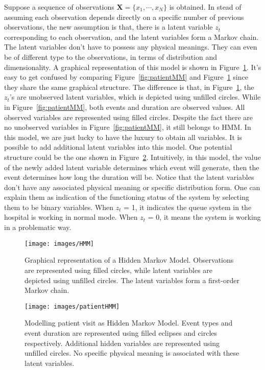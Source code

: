 Suppose a sequence of observations \(\mathbf{X} = \{x_1, \cdots, x_N\}\) is obtained. In stead of assuming each observation depends directly on a specific number of previous observations, the new assumption is that, there is a latent variable \(z_t\) corresponding to each observation, and the latent variables form a Markov chain. The latent variables don't have to possess any physical meanings. They can even be of different type to the observations, in terms of distribution and dimensionality. A graphical representation of this model is shown in Figure~\ref{fig:HMM}. It's easy to get confused by comparing Figure~\ref{fig:patientMM} and Figure~\ref{fig:HMM} since they share the same graphical structure. The difference is that, in Figure~\ref{fig:HMM}, the \(z_t\)'s are unobserved latent variables, which is depicted using unfilled circles. While in Figure~\ref{fig:patientMM}, both events and duration are observed values. All observed variables are represented using filled circles. Despite the fact there are no unobserved variables in Figure~\ref{fig:patientMM}, it still belongs to HMM. In this model, we are just lucky to have the luxury to obtain all variables. It is possible to add additional latent variables into this model. One potential structure could be the one shown in Figure~\ref{fig:patientHMM}. Intuitively, in this model, the value of the newly added latent variable determines which event will generate, then the event determines how long the duration will be. Notice that the latent variables don't have any associated physical meaning or specific distribution form. One can explain them as indication of the functioning status of the system by selecting them to be binary variables. When \(z_t\) = 1, it indicates the queue system in the hospital is working in normal mode. When \(z_t\) = 0, it means the system is working in a problematic way.

\begin{figure}[!ht]
	\begin{center}
		\texttt{[image: images/HMM]}
		\caption{Graphical representation of a Hidden Markov Model. Observations are represented using filled circles, while latent variables are depicted using unfilled circles. The latent variables form a first-order Markov chain.}
		\label{fig:HMM}
	\end{center}
\end{figure}

\begin{figure}[!ht]
	\begin{center}
		\texttt{[image: images/patientHMM]}
		\caption{Modelling patient visit as Hidden Markov Model. Event types and event duration are represented using filled eclipses and circles respectively. Additional hidden variables are represented using unfilled circles. No specific physical meaning is associated with these latent variables.}
		\label{fig:patientHMM}
	\end{center}
\end{figure}

